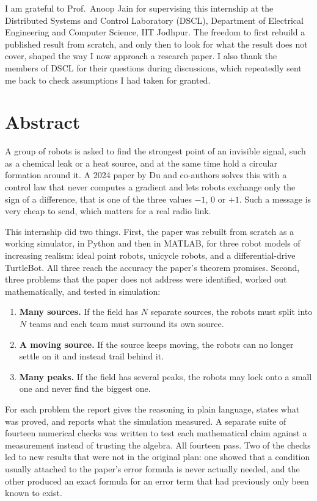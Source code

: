 \documentclass[11pt,a4paper]{article}
\begin{document}
I am grateful to Prof.\ Anoop Jain for supervising this internship at the Distributed Systems and
Control Laboratory (DSCL), Department of Electrical Engineering and Computer Science, IIT Jodhpur.
The freedom to first rebuild a published result from scratch, and only then to look for what the
result does not cover, shaped the way I now approach a research paper. I also thank the members of
DSCL for their questions during discussions, which repeatedly sent me back to check assumptions I
had taken for granted.

\section*{Abstract}

A group of robots is asked to find the strongest point of an invisible signal, such as a chemical
leak or a heat source, and at the same time hold a circular formation around it. A 2024 paper by
Du and co-authors solves this with a control law that never computes a gradient and lets robots
exchange only the sign of a difference, that is one of the three values $-1$, $0$ or $+1$. Such a
message is very cheap to send, which matters for a real radio link.

This internship did two things. First, the paper was rebuilt from scratch as a working simulator,
in Python and then in MATLAB, for three robot models of increasing realism: ideal point robots,
unicycle robots, and a differential-drive TurtleBot. All three reach the accuracy the paper's
theorem promises. Second, three problems that the paper does not address were identified, worked
out mathematically, and tested in simulation:

\begin{enumerate}[label=(\arabic*)]
    \item \textbf{Many sources.} If the field has $N$ separate sources, the robots must split into
    $N$ teams and each team must surround its own source.
    \item \textbf{A moving source.} If the source keeps moving, the robots can no longer settle on
    it and instead trail behind it.
    \item \textbf{Many peaks.} If the field has several peaks, the robots may lock onto a small one
    and never find the biggest one.
\end{enumerate}

For each problem the report gives the reasoning in plain language, states what was proved, and
reports what the simulation measured. A separate suite of fourteen numerical checks was written to
test each mathematical claim against a measurement instead of trusting the algebra. All fourteen
pass. Two of the checks led to new results that were not in the original plan: one showed that a
condition usually attached to the paper's error formula is never actually needed, and the other
produced an exact formula for an error term that had previously only been known to exist.
\end{document}
